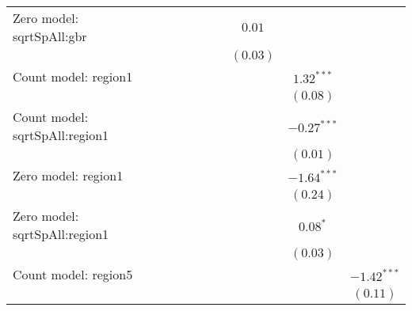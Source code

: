 \begin{sidewaystable}
\begin{center}
{\begin{tabular}{l c c c c c c c c c}
Zero model: sqrtSpAll:gbr      &               &               &               &               &                &               & $0.01$        &                &                \\
                               &               &               &               &               &                &               & $(0.03)$      &                &                \\
Count model: region1           &               &               &               &               &                &               &               & $1.32^{***}$   &                \\
                               &               &               &               &               &                &               &               & $(0.08)$       &                \\
Count model: sqrtSpAll:region1 &               &               &               &               &                &               &               & $-0.27^{***}$  &                \\
                               &               &               &               &               &                &               &               & $(0.01)$       &                \\
Zero model: region1            &               &               &               &               &                &               &               & $-1.64^{***}$  &                \\
                               &               &               &               &               &                &               &               & $(0.24)$       &                \\
Zero model: sqrtSpAll:region1  &               &               &               &               &                &               &               & $0.08^{*}$     &                \\
                               &               &               &               &               &                &               &               & $(0.03)$       &                \\
Count model: region5           &               &               &               &               &                &               &               &                & $-1.42^{***}$  \\
                               &               &               &               &               &                &               &               &                & $(0.11)$       \\

\end{tabular}}
\end{center}
\end{sidewaystable}
